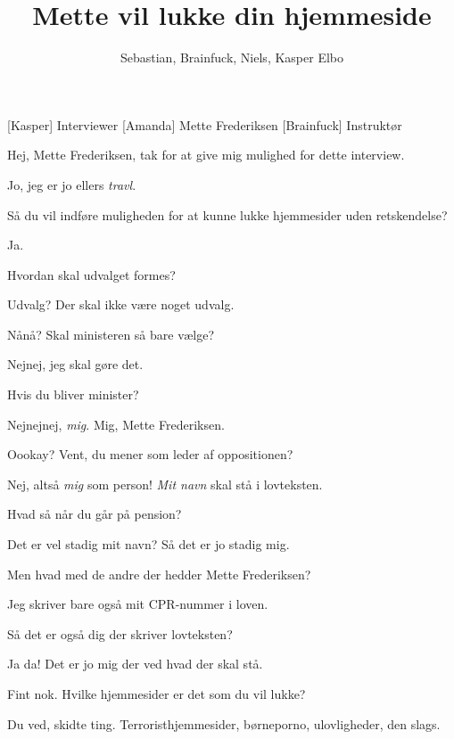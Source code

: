 \documentclass[a4paper,11pt]{article}
\title{Mette vil lukke din hjemmeside}
\author{Sebastian, Brainfuck, Niels, Kasper Elbo}
\begin{document}
\maketitle

\begin{roles}
    [Kasper] Interviewer
    [Amanda] Mette Frederiksen
    [Brainfuck] Instruktør
\end{roles}


\begin{sketch}

 Hej, Mette Frederiksen, tak for at give mig mulighed for dette interview.

 Jo, jeg er jo ellers \emph{travl}.

 Så du vil indføre muligheden for at kunne lukke hjemmesider uden
retskendelse?

 Ja.

 Hvordan skal udvalget formes?

 Udvalg?  Der skal ikke være noget udvalg.

 Nånå?  Skal ministeren så bare vælge?

 Nejnej, jeg skal gøre det.

 Hvis du bliver minister?

 Nejnejnej, \emph{mig}.  Mig, Mette Frederiksen.

 Oookay?  Vent, du mener som leder af oppositionen?

 Nej, altså \emph{mig} som person! \emph{Mit navn} skal stå i lovteksten.

 Hvad så når du går på pension?

 Det er vel stadig mit navn?  Så det er jo stadig mig.

 Men hvad med de andre der hedder Mette Frederiksen?

 Jeg skriver bare også mit CPR-nummer i loven.

 Så det er også dig der skriver lovteksten?

 Ja da!  Det er jo mig der ved hvad der skal stå.

 Fint nok.  Hvilke hjemmesider er det som du vil lukke?

 Du ved, skidte ting.  Terroristhjemmesider, børneporno, ulovligheder, den
slags.


\end{sketch}
\end{document}
